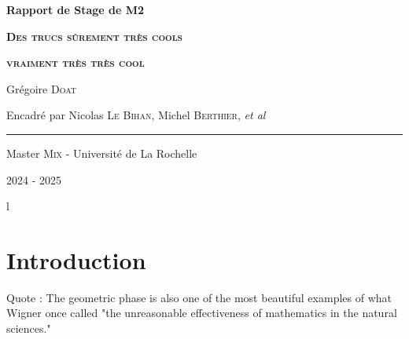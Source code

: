 \documentclass[hidelinks, french, oneside]{article}
\newcommand{\etal}{\textit{et al}}
\theoremstyle{enonce}
\theoremstyle{special}
\theoremstyle{rq}
\theoremstyle{exo}
\theoremstyle{demo}
\begin{document}
\begin{titlepage}
	
	\centering
	\vspace{1.5cm}
	{\huge\textbf{Rapport de Stage de M2}}\par
	
	\vspace{2cm}
	{\huge\textbf{\textsc{Des trucs sûrement très cools}}}\par 
	\vspace{0.5cm}
	
	{\huge\textbf{\textsc{vraiment très très cool}}}\par
	\vspace{2.0cm}
	
	{\large Grégoire \textsc{Doat}}\par
	\vspace{0.5cm}
	\vfill
	
	{\large Encadré par Nicolas \textsc{Le Bihan},  Michel \textsc{Berthier}, \etal}\par
	\vspace{0.5cm}
	
	\rule{10cm}{0.4pt}\par
	\vspace{0.7cm}
	
	{Master \textsc{Mix} - Université de La Rochelle}\par
	\vspace{0.25cm}
	
	{\large 2024 - 2025}
\end{titlepage}

\newpage
\tableofcontents
\thispagestyle{empty}
{\color{white}l}


\newpage
\setcounter{page}{1}

{}
\section*{Introduction}

Quote : The geometric phase is also one of the most beautiful examples of what Wigner once called "the unreasonable effectiveness of mathematics in the natural sciences." \cite[p. 4]{bohm_geometric_2003}
\end{document}
